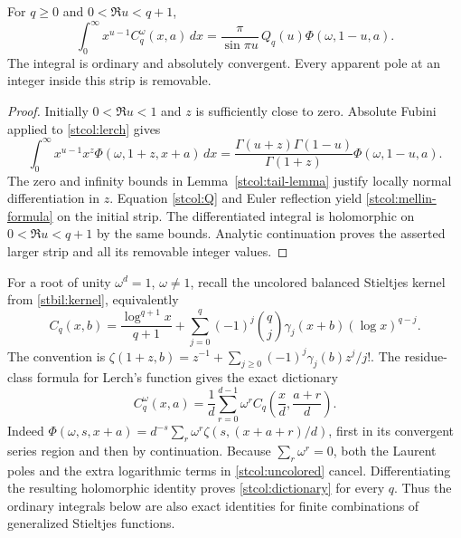 \begin{theorem}\label{stcol:mellin}
For $q\ge0$ and $0<\Re u<q+1$,
\begin{equation}\label{stcol:mellin-formula}
 \int_0^\infty x^{u-1}C_q^\omega(x,a)\,dx
   =\frac{\pi}{\sin\pi u}\,Q_q(u)\Phi(\omega,1-u,a).
\end{equation}
The integral is ordinary and absolutely convergent.  Every apparent
pole at an integer inside this strip is removable.
\end{theorem}
\begin{proof}
Initially $0<\Re u<1$ and $z$ is sufficiently close to zero.  Absolute
Fubini applied to \eqref{stcol:lerch} gives
\[
 \int_0^\infty x^{u-1}x^z\Phi(\omega,1+z,x+a)\,dx
 =\frac{\Gamma(u+z)\Gamma(1-u)}{\Gamma(1+z)}
       \Phi(\omega,1-u,a).
\]
The zero and infinity bounds in Lemma~\ref{stcol:tail-lemma}
justify locally normal differentiation in $z$.  Equation
\eqref{stcol:Q} and Euler reflection yield
\eqref{stcol:mellin-formula} on the initial strip.  The differentiated
integral is holomorphic on $0<\Re u<q+1$ by the same bounds.
Analytic continuation proves the asserted larger strip and all its
removable integer values.
\end{proof}

For a root of unity $\omega^d=1$, $\omega\ne1$, recall the uncolored
balanced Stieltjes kernel from \eqref{stbil:kernel}, equivalently
\begin{equation}\label{stcol:uncolored}
 C_q(x,b)=\frac{\log^{q+1}x}{q+1}
       +\sum_{j=0}^q(-1)^j\binom qj
                  \gamma_j(x+b)(\log x)^{q-j}.
\end{equation}
The convention is
$\zeta(1+z,b)=z^{-1}+\sum_{j\ge0}(-1)^j\gamma_j(b)z^j/j!$.
The residue-class formula for Lerch's function gives the exact dictionary
\begin{equation}\label{stcol:dictionary}
 C_q^\omega(x,a)=\frac1d\sum_{r=0}^{d-1}
        \omega^r C_q\left(\frac xd,\frac{a+r}{d}\right).
\end{equation}
Indeed $\Phi(\omega,s,x+a)=d^{-s}\sum_r\omega^r
\zeta(s,(x+a+r)/d)$, first in its convergent series region and then
by continuation.  Because $\sum_r\omega^r=0$, both the Laurent poles
and the extra logarithmic terms in \eqref{stcol:uncolored} cancel.
Differentiating the resulting holomorphic identity proves
\eqref{stcol:dictionary} for every $q$.  Thus the ordinary integrals
below are also exact identities for finite combinations of generalized
Stieltjes functions.


